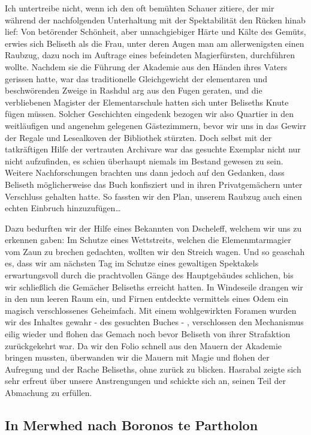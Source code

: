Ich untertreibe nicht, wenn ich den oft bemühten Schauer zitiere, der mir während der nachfolgenden Unterhaltung mit der Spektabilität den Rücken hinab lief: Von betörender Schönheit, aber unnachgiebiger Härte und Kälte des Gemüts, erwies sich Beliseth als die Frau, unter deren Augen man am allerwenigsten einen Raubzug, dazu noch im Auftrage eines befeindeten Magierfürsten, durchführen wollte. Nachdem sie die Führung der Akademie aus den Händen ihres Vaters gerissen hatte, war das traditionelle Gleichgewicht der elementaren und beschwörenden Zweige in Rashdul arg aus den Fugen geraten, und die verbliebenen Magister der Elementarschule hatten sich unter Beliseths Knute fügen müssen. Solcher Geschichten eingedenk bezogen wir also Quartier in den weitläufigen und angenehm gelegenen Gästezimmern, bevor wir uns in das Gewirr der Regale und Lesealkoven der Bibliothek stürzten. Doch selbst mit der tatkräftigen Hilfe der vertrauten Archivare war das gesuchte Exemplar nicht nur nicht aufzufinden, es schien überhaupt niemals im Bestand gewesen zu sein. Weitere Nachforschungen brachten uns dann jedoch auf den Gedanken, dass Beliseth möglicherweise das Buch konfisziert und in ihren Privatgemächern unter Verschluss gehalten hatte. So fassten wir den Plan, unserem Raubzug auch einen echten Einbruch hinzuzufügen\dots

Dazu bedurften wir der Hilfe eines Bekannten von Dscheleff, welchem wir uns zu erkennen gaben: Im Schutze eines Wettstreits, welchen die Elemenmtarmagier vom Zaun zu brechen gedachten, wollten wir den Streich wagen. Und so geaschah es, dass wir am nächsten Tag im Schutze eines gewaltigen Spektakels erwartungsvoll durch die prachtvollen Gänge des Hauptgebäudes schlichen, bis wir schließlich die Gemächer Beliseths erreicht hatten. In Windeseile drangen wir in den nun leeren Raum ein, und Firnen entdeckte vermittels eines Odem ein magisch verschlossenes Geheimfach. Mit einem wohlgewirkten Foramen wurden wir des Inhaltes gewahr - des gesuchten Buches - , verschlossen den Mechanismus eilig wieder und flohen das Gemach noch bevor Beliseth von ihrer Strafaktion zurückgekehrt war. Da wir den Folio schnell aus den Mauern der Akademie bringen mussten, überwanden wir die Mauern mit Magie und flohen der Aufregung und der Rache Beliseths, ohne zurück zu blicken.
Hasrabal zeigte sich sehr erfreut über unsere Anstrengungen und schickte sich an, seinen Teil der Abmachung zu erfüllen.

\subsection{In Merwhed nach Boronos te Partholon}

